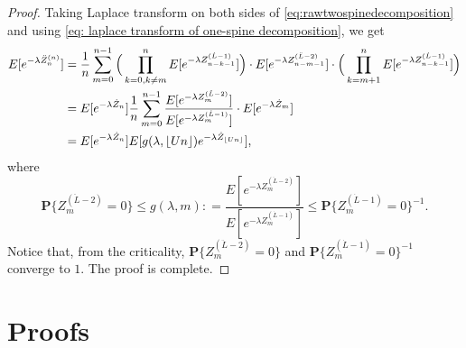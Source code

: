 \documentclass[12pt,a4paper]{amsart}
\DeclarePairedDelimiter\floor{\lfloor}{\rfloor}
\numberwithin{equation}{section}
\begin{document}
\begin{proof}
	Taking Laplace transform on both sides of \eqref{eq:rawtwospinedecomposition}  and using \eqref{eq: laplace transform of one-spine decomposition}, we get
\begin{equation} \label{eq:laplacetransformationoftwospinedecomposition} \begin{split}
	E [ e^{- \lambda \ddot Z_n^{(n)}} ]
	&= \frac{1}{n}\sum_{m=0}^{n-1} \Big( \prod_{k=0,k\neq m}^{n} E[e^{-\lambda Z^{(\dot L - 1)}_{n-k-1}}] \Big) \cdot E [e^{-\lambda Z^{(\ddot L - 2)}_{n-m-1}}] \cdot \Big(\prod_{k= m+1}^n E [e^{-\lambda Z^{(\dot L - 1)}_{n-k-1}}]\Big)
	\\&= E [e^{-\lambda \dot Z_n}]  \frac{1}{n}\sum_{m=0}^{n-1}   \frac{ E [e^{-\lambda Z^{(\ddot L - 2)}_{m}}] }{ E[e^{-\lambda Z^{(\dot L - 1)}_{m}}] } \cdot E[e^{- \lambda \dot Z_{m}}]
	\\&= E [e^{-\lambda \dot Z_n}] E[g(\lambda, \floor{Un})e^{-\lambda \dot Z_{\floor{Un}}}],
\end{split}
\end{equation}
	where
\[
	\mathbf P\{Z^{(\ddot L - 2)}_m=0\}
	\leq	g(\lambda,m)
	: = \frac{ E [e^{-\lambda Z^{(\ddot L - 2)}_{m}}] }{ E[e^{-\lambda Z^{(\dot L - 1)}_{m}}] }
	\leq \mathbf P\{Z^{(\dot L - 1)}_m = 0\}^{-1}.
\]
	Notice that, from the criticality, $\mathbf P\{Z^{(\ddot L - 2)}_m=0\}$ and $\mathbf P\{Z^{(\dot L - 1)}_m = 0\}^{-1}$ converge to $1$.
	The proof is complete.
\end{proof}



\section{Proofs}
\label{sec: proofs}
\end{document}
